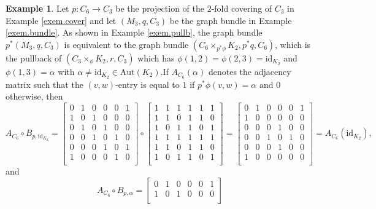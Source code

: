 \documentclass{amsart}
\theoremstyle{definition}
\newtheorem{example}[theo]{Example}
\numberwithin{equation}{section}
\begin{document}
\begin{example}
Let $p: C_6 \longrightarrow C_3$ be the projection of the $2$-fold covering of $C_3$  in Example \ref{exem.cover} and let $(M_3, q, C_3)$ be the graph bundle in Example \ref{exem.bundle}. As shown in Example \ref{exem.pullb}, the graph bundle $p^*(M_3, q, C_3)$ is equivalent to the graph bundle $(C_6 \times_{p^* \phi} K_2, p^* q, C_6)$, which is the pullback of $(C_3 \times_\phi K_2, r, C_3)$ which has $\phi(1,2) = \phi(2,3) = \mathrm{id}_{K_2}$ and $\phi(1,3) = \alpha$ with   $\alpha \neq \mathrm{id}_{K_2} \in \mathrm{Aut}(K_2)$.If $A_{C_6}(\alpha)$ denotes the adjacency matrix such that the $(v,w)$-entry is equal to $1$ if $p^*\phi(v,w)= \alpha$ and $0$ otherwise, then
\begin{equation*}A_{C_6} \circ B_{p,\mathrm{id}_{K_2}} = 
\begin{bmatrix}
0 & 1 & 0 &0 &0 &1\\
1 & 0 & 1 &0 &0 &0\\
0 & 1 & 0 &1 &0 &0\\
0 & 0 & 1 &0 &1 &0\\
0 & 0 & 0 &1 &0 &1\\
1 & 0 & 0 &0 &1 &0\\
\end{bmatrix}
\circ 
\begin{bmatrix}
1 & 1 & 1 &1 &1 &1\\
1 & 1 & 0 &1 &1 &0\\
1 & 0 & 1 &1 &0 &1\\
1 & 1 & 1 &1 &1 &1\\
1 & 1 & 0 &1 &1 &0\\
1 & 0 & 1 &1 &0 &1\\
\end{bmatrix}
=
\begin{bmatrix}
0 & 1 & 0 &0 &0 &1\\
1 & 0 & 0 &0 &0 &0\\
0 & 0 & 0 &1 &0 &0\\
0 & 0 & 1 &0 &1 &0\\
0 & 0 & 0 &1 &0 &0\\
1 & 0 & 0 &0 &0 &0\\
\end{bmatrix}
= A_{C_6}(\mathrm{id}_{K_2}),
\end{equation*}
and
\begin{equation*}
A_{C_6} \circ B_{p,\alpha} = \begin{bmatrix}
0 & 1 & 0 &0 &0 &1\\
1 & 0 & 1 &0 &0 &0\\

\end{bmatrix}
\end{equation*}
\end{example}
\end{document}
